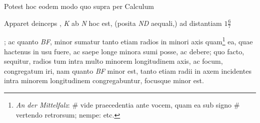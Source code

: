 Potest hoc eodem modo quo supra per Calculum  \rule[0mm]{0mm}{10mm} Apparet deinceps , \textit{K} ab \textit{N} hoc est, (posita \textit{ND} aequali,) ad distantiam $\displaystyle1\frac{6}{7}$\rule[-4mm]{0mm}{10mm}; ac quanto \textit{BF}, minor sumatur tanto etiam radios in minori axis  quam\footnote{\textit{An der Mittelfalz}: \#\hspace{-8.8pt}{$\Circle$} vide praecedentia ante vocem, quam ea sub signo \# vertendo retrorsum; nempe:  etc.} ea, quae hactenus in usu fuere, ac saepe longe minora sumi posse, ac debere; quo facto, sequitur, radios tum intra multo minorem longitudinem axis, ac focum\protect{}, congregatum iri, nam quanto \textit{BF} minor est, tanto etiam radii in axem incidentes intra minorem longitudinem congregabuntur, focusque\protect{} minor est.\pend 
